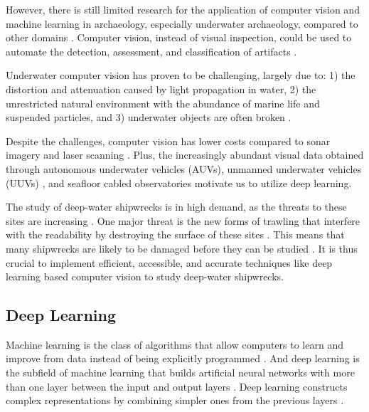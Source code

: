 \documentclass[a4paper, 11pt, oneside]{article}
\begin{document}
However, there is still limited research for the application of computer vision and machine learning in archaeology,
especially underwater archaeology, compared to other domains \cite{maaten2007computer, qin2015underwater}.
Computer vision, instead of visual inspection, could be used to automate the detection, assessment, and classification
of artifacts \cite{maaten2007computer}.

Underwater computer vision has proven to be challenging, largely due to: 1) the distortion and attenuation caused by
light propagation in water, 2) the unrestricted natural environment with the abundance of marine life and suspended
particles, and 3) underwater objects are often broken
\cite{qin2015underwater, rizzini2015investigation, lu2017underwater, mccarthy20193d}.

Despite the challenges, computer vision has lower costs \cite{rizzini2015investigation} compared to sonar imagery
\cite{abu2019statistically} and laser scanning \cite{gordon1992use}. Plus, the increasingly abundant visual data obtained
through autonomous underwater vehicles (AUVs), unmanned underwater vehicles (UUVs)
\cite{lu2017underwater, moniruzzaman2017deep}, and seafloor cabled observatories \cite{qin2015underwater} motivate us
to utilize deep learning.

The study of deep-water shipwrecks is in high demand, as the threats to these sites are increasing
\cite{drap2015underwater}. One major threat is the new forms of trawling that interfere with the readability by
destroying the surface of these sites \cite{drap2015underwater}. This means that many shipwrecks are likely to be damaged
before they can be studied \cite{drap2015underwater}. It is thus crucial to implement efficient, accessible, and accurate
techniques like deep learning based computer vision to study deep-water shipwrecks.

\subsection{Deep Learning}

Machine learning is the class of algorithms that allow computers to learn and improve from data instead of being
explicitly programmed \cite{samuel1959some, geron2019hands}. And deep learning is the subfield of machine learning that
builds artificial neural networks with more than one layer between the input and output layers
\cite{geron2019hands, burkov2019hundred, zhang2018definition}. Deep learning constructs complex representations by
combining simpler ones from the previous layers \cite{goodfellow2016deep}.
\end{document}
